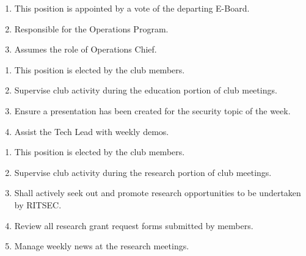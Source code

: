 \begin{enumerate}
	\item This position is appointed by a vote of the departing E-Board.
	\item Responsible for the Operations Program.
	\item Assumes the role of Operations Chief.
\end{enumerate}


\begin{enumerate}
	\item This position is elected by the club members.
	\item Supervise club activity during the education portion of club meetings.
	\item Ensure a presentation has been created for the security topic of the week.
	\item Assist the Tech Lead with weekly demos.
\end{enumerate}


\begin{enumerate}
	\item This position is elected by the club members.
	\item Supervise club activity during the research portion of club meetings.
	\item Shall actively seek out and promote research opportunities to be undertaken by
	      RITSEC.
	\item Review all research grant request forms submitted by members.
	\item Manage weekly news at the research meetings.
\end{enumerate}